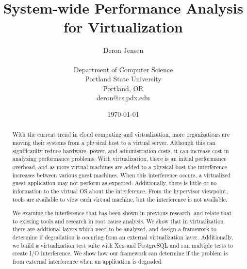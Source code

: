 \documentclass[12pt,onecolumn,oneside]{article}
\begin{document}
\title{System-wide Performance Analysis for Virtualization}
\author{Deron Jensen\\
\\
Department of Computer Science\\
Portland State University\\
Portland, OR \\
deron@cs.pdx.edu \\
}
\date{\today}
  \maketitle
\newpage

\begin{abstract}
With the current trend in cloud computing and virtualization, more organizations are moving their systems from a physical host to a virtual server.  Although this can significanlty reduce hardware, power, and administration costs, it can increase cost in analyzing performance problems.  With virtualization, there is an initial performance overhead, and as more virtual machines are added to a physical host the interference increases between various guest machines.  When this interference occurs, a virtualized guest application may not perform as expected.  Additionally, there is little or no information to the virtual OS about the interference.  From the hypervisor viewpoint, tools are available to view each virtual machine, but the interference is not available. 

We examine the interference that has been shown in previous research, and relate that to existing tools and research in root cause analysis.  We show that in virtualization there are addtional layers which need to be analyzed, and design a framework to determine if degradation is occuring from an external virtualization layer.  Additionally, we build a virtualization test suite with Xen and PostgreSQL and run multiple tests to create I/O interference.  We show how our framework can determine if the problem is from external interference when an application is degraded.   
  \end{abstract}
\newpage

\setcounter{page}{1}

\tableofcontents    %
\newpage
\listoftables
\newpage
\listoffigures 
\newpage
\end{document}
